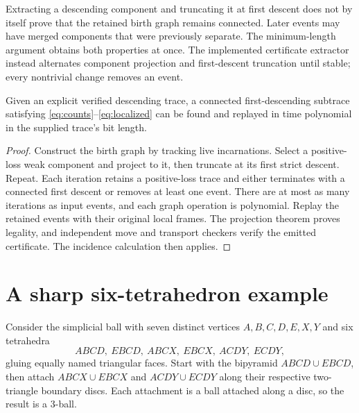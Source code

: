 \begin{remark}
Extracting a descending component and truncating it at first descent does
not by itself prove that the retained birth graph remains connected. Later
events may have merged components that were previously separate. The
minimum-length argument obtains both properties at once. The implemented
certificate extractor instead alternates component projection and first-descent
truncation until stable; every nontrivial change removes an event.
\end{remark}

\begin{corollary}\label{cor:extraction}
Given an explicit verified descending trace, a connected first-descending
subtrace satisfying \eqref{eq:counts}--\eqref{eq:localized} can be found and
replayed in time polynomial in the supplied trace's bit length.
\end{corollary}
\begin{proof}
Construct the birth graph by tracking live incarnations. Select a positive-loss
weak component and project to it, then truncate at its first strict descent.
Repeat. Each iteration retains a positive-loss trace and either terminates
with a connected first descent or removes at least one event. There are at
most as many iterations as input events, and each graph operation is polynomial.
Replay the retained events with their original local frames. The projection
theorem proves legality, and independent move and transport checkers verify
the emitted certificate. The incidence calculation then applies.
\end{proof}

\section{A sharp six-tetrahedron example}\label{sec:sharp}

Consider the simplicial ball with seven distinct vertices $A,B,C,D,E,X,Y$
and six tetrahedra
\begin{equation}\label{eq:gadget}
 ABCD,\ EBCD,\ ABCX,\ EBCX,\ ACDY,\ ECDY,
\end{equation}
gluing equally named triangular faces. Start with the bipyramid
$ABCD\cup EBCD$, then attach $ABCX\cup EBCX$ and $ACDY\cup ECDY$ along their
respective two-triangle boundary discs. Each attachment is a ball attached
along a disc, so the result is a $3$-ball.

